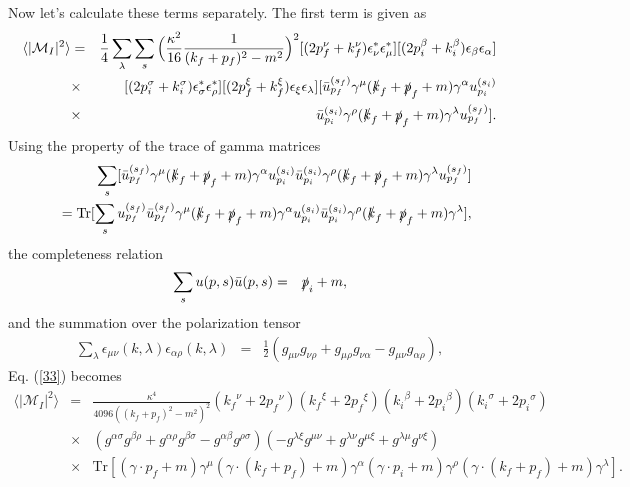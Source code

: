 \documentclass[11pt,showpacs,preprintnumbers,amsmath,amssymb,prd,nofootinbib,superscriptaddress]{revtex4-2}
\newcommand{\bea}{\begin{eqnarray}}
\newcommand{\eea}{\end{eqnarray}}
\begin{document}
Now let's calculate these terms separately. The first term is given as
\begin{eqnarray}
    \langle|\mathcal{M}_I|^2\rangle&=&\frac{1}{4}\sum_\lambda\sum_s\Big(\frac{\kappa^2}{16}\frac{1}{(k_f+p_f)^2-m^2}\Big)^2[(2p_f^\nu+k_f^\nu)\epsilon_\nu^*\epsilon_\mu^*][(2p_i^\beta+k_i^\beta)\epsilon_\beta\epsilon_\alpha]\nonumber\\
    &\times&[(2p_i^\sigma+k_i^\sigma)\epsilon_\sigma^*\epsilon_\rho^*][(2p_f^\xi+k_f^\xi)\epsilon_\xi\epsilon_\lambda][\Bar{u}^{(s_f)}_{p_f}\gamma^\mu(\slashed{k}_f+\slashed{p}_f+m)\gamma^\alpha u^{(s_i)}_{p_i}\nonumber\\
    &\times&\Bar{u}^{(s_i)}_{p_i}\gamma^\rho(\slashed{k}_f+\slashed{p}_f+m)\gamma^\lambda u^{(s_f)}_{p_f}].\label{33}
\end{eqnarray}
Using the property of the trace of gamma matrices
\begin{eqnarray}
    &&\sum_s[\Bar{u}^{(s_f)}_{p_f}\gamma^\mu(\slashed{k}_f+\slashed{p}_f+m)\gamma^\alpha u^{(s_i)}_{p_i}\Bar{u}^{(s_i)}_{p_i}\gamma^\rho(\slashed{k}_f+\slashed{p}_f+m)\gamma^\lambda u^{(s_f)}_{p_f}]\nonumber\\
    &&=\mathrm{Tr}[\sum_su^{(s_f)}_{p_f}\Bar{u}^{(s_f)}_{p_f}\gamma^\mu(\slashed{k}_f+\slashed{p}_f+m)\gamma^\alpha u^{(s_i)}_{p_i}\Bar{u}^{(s_i)}_{p_i}\gamma^\rho(\slashed{k}_f+\slashed{p}_f+m)\gamma^\lambda ],\label{trace}
\end{eqnarray}
the completeness relation
\begin{eqnarray}
    \sum_su(p,s)\Bar{u}(p,s)&=&\slashed{p}_i+m,\label{2.28}
\end{eqnarray}
and the summation over the polarization tensor
\bea
 \sum_\lambda\epsilon_{\mu\nu}(k,\lambda)\epsilon_{\alpha\rho}(k,\lambda)&=&\frac{1}{2}(g_{\mu\nu}g_{\nu\rho}+g_{\mu\rho}g_{\nu\alpha}-g_{\mu\nu}g_{\alpha\rho}),
\eea
Eq. (\ref{33}) becomes
\begin{eqnarray}   \langle|\mathcal{M}_I|^2\rangle&=&\frac{\kappa ^4}{4096 \left((k_f+p_f)^2-m^2\right)^2}\left({k_f}^{\nu }+2 {p_f}^{\nu }\right) \left({k_f}^{\xi }+2 {p_f}^{\xi }\right)
   \left({k_i}^{\beta }+2 {p_i }^{\beta }\right) \left({k_i}^{\sigma }+2 {p_i }^{\sigma }\right)\nonumber\\
   &\times&\left({g}^{\alpha \sigma }
   {g}^{\beta \rho }+{g}^{\alpha \rho } {g}^{\beta \sigma }-{g}^{\alpha \beta } {g}^{\rho \sigma }\right) \left(-{g}^{\lambda \xi } {g}^{\mu \nu
   }+{g}^{\lambda \nu } {g}^{\mu \xi }+{g}^{\lambda \mu } {g}^{\nu \xi }\right)\nonumber\\
   &\times&\mathrm{Tr}[\left({\gamma }\cdot {p_f}+m\right){\gamma }^{\mu }\left({\gamma }\cdot
   \left({k_f}+{p_f}\right)+m\right){\gamma }^{\alpha }\left({\gamma }\cdot p_i+m\right){\gamma }^{\rho }\left({\gamma }\cdot\left({k_f}+{p_f}\right)+m\right){\gamma }^{\lambda }].\nonumber\\
\end{eqnarray}
\end{document}
